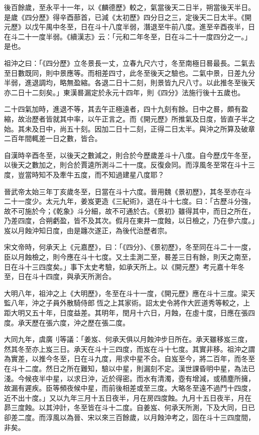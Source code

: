 \begin{pinyinscope}
 後百餘歲，至永平十一年，以《麟德歷》較之，氣當後天二日半，朔當後天半日。是歲《四分歷》得辛酉蔀首，已減《太初歷》四分日之三，定後天二日太半。《開元歷》以戊午禺中冬至，日在斗十八度半弱，潛退至牛前八度。進至辛酉夜半，日在斗二十一度半弱。《續漢志》云：「元和二年冬至，日在斗二十一度四分之一。」是也。



 祖沖之曰：「《四分歷》立冬景長一丈，立春九尺六寸，冬至南極日晷最長。二氣去至日數既同，則中景應等。而相差四寸，此冬至後天之驗也。二氣中景，日差九分半弱，進退調均，略無盈縮。各退二日十二刻，則景皆九尺八寸。以此推冬至後天亦二日十二刻矣。」東漢晷漏定於永元十四年，則《四分》法施行後十五歲也。



 二十四氣加時，進退不等，其去午正極遠者，四十九刻有餘。日中之晷，頗有盈縮，故治歷者皆就其中率，以午正言之。而《開元歷》所推氣及日度，皆直子半之始。其未及日中，尚五十刻。因加二日十二刻，正得二日太半。與沖之所算及破章二百年間輒差一日之數，皆合。



 自漢時辛酉冬至，以後天之數減之，則合於今歷歲差斗十八度。自今歷戊午冬至，以後天之數加之，則合於賈逵所測斗二十一度。反復僉同。而淳風冬至常在斗十三度，豈當時知不及牽牛五度，而不知過建星八度耶？



 晉武帝太始三年丁亥歲冬至，日當在斗十六度。晉用魏《景初歷》，其冬至亦在斗二十一度少。太元九年，姜岌更造《三紀術》，退在斗十七度。曰：「古歷斗分強，故不可施於今；《乾象》斗分細，故不可通於古。《景初》雖得其中，而日之所在，乃差四度，合朔虧盈，皆不及其次。假月在東井一度蝕，以日檢之，乃在參六度。」岌以月蝕沖知日度，由是躔次遂正，為後代治歷者宗。



 宋文帝時，何承天上《元嘉歷》，曰：「《四分》、《景初歷》，冬至同在斗二十一度，臣以月蝕檢之，則今應在斗十七度。又土圭測二至，晷差三日有餘，則天之南至，日在斗十三四度矣。」事下太史考驗，如承天所上。以《開元歷》考元嘉十年冬至，日在斗十四度，與承天所測合。



 大明八年，祖沖之上《大明歷》，冬至在斗十一度，《開元歷》應在斗十三度。梁天監八年，沖之子員外散騎侍郎恆之上其家術。詔太史令將作大匠道秀等較之，上距大明又五十年，日度益差。其明年，閏月十六日，月蝕，在虛十度，日應在張四度。承天歷在張六度，沖之歷在張二度。



 大同九年，虞廣刂等議：「姜岌、何承天俱以月蝕沖步日所在。承天雖移岌三度，然其冬至亦上岌三日。承天在斗十三四度，而岌在斗十七度。其實非移。祖沖之謂為實差，以推今冬至，日在斗九度，用求中星不合。自岌至今，將二百年，而冬至在斗十二度。然日之所在難知，驗以中星，則漏刻不定。漢世課昏明中星，為法已淺。今候夜半中星，以求日沖，近於得密。而水有清濁，壺有增減，或積塵所擁，故漏有遲疾。臣等頻夜候中星，而前後相差或至三度。大略冬至遠不過鬥十四度，近不出十度。」又以九年三月十五日夜半，月在房四度蝕。九月十五日夜半，月在昴三度蝕。以其沖計，冬至皆在斗十二度。自姜岌、何承天所測，下及大同，日已卻差二度。而淳風以為晉、宋以來三百餘歲，以月蝕沖考之，固在斗十三四度間，非矣。




\end{pinyinscope}
